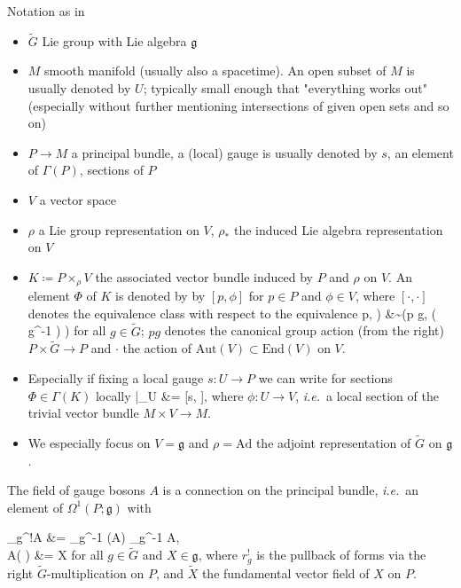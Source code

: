 \documentclass[a4paper,oneside,11pt,bibliography=totoc]{scrartcl}
\def\bas#1\eas{\begin{align*}#1\end{align*}}
\theoremstyle{plain}
\theoremstyle{remark}
\theoremstyle{definition}
\begin{document}
Notation as in \cite{Hamilton}

\begin{itemize}
	\item $\widetilde{G}$ Lie group with Lie algebra $\mathfrak{g}$
	\item $M$ smooth manifold (usually also a spacetime). An open subset of $M$ is usually denoted by $U$; typically small enough that "everything works out" (especially without further mentioning intersections of given open sets and so on)
	\item $P \to M$ a principal bundle, a (local) gauge is usually denoted by $s$, an element of $\Gamma(P)$, sections of $P$
	\item $V$ a vector space
	\item $\rho$ a Lie group representation on $V$, $\rho_*$ the induced Lie algebra representation on $V$
	\item $K \coloneqq P \times_\rho V$ the associated vector bundle induced by $P$ and $\rho$ on $V$. An element $\Phi$ of $K$ is denoted by by $[p, \phi]$ for $p \in P$ and $\phi \in V$, where $[ \cdot, \cdot]$ denotes the equivalence class with respect to the equivalence
	\bas
		(p, \phi) &\sim \mleft(p g, \rho\mleft( g^{-1} \mright) \cdot \phi \mright)
	\eas
	for all $g \in \widetilde{G}$; $pg$ denotes the canonical group action (from the right) $P \times \widetilde{G} \to P$ and $\cdot$ the action of $\mathrm{Aut}(V) \subset \mathrm{End}(V)$ on $V$.
	\item Especially if fixing a local gauge $s: U \to P$ we can write for sections $\Phi \in \Gamma(K)$ locally 
	\bas
		\Phi|_U
		&=
		[s, \phi],
	\eas
	where $\phi: U \to V$, \textit{i.e.}\ a local section of the trivial vector bundle $M \times V \to M$.
	\item We especially focus on $V = \mathfrak{g}$ and $\rho = \mathrm{Ad}$ the adjoint representation of $\widetilde{G}$ on $\mathfrak{g}$.
\end{itemize}

The field of gauge bosons $A$ is a connection on the principal bundle, \textit{i.e.}\ an element of $\Omega^1(P; \mathfrak{g})$ with

\bas
r_g^!A &= _{g^{-1}} (A) \coloneqq {}_{g^{-1}} \circ A, \\
A\mleft(  \mright) &= X
\eas
for all $g \in \widetilde{G}$ and $X \in \mathfrak{g}$, where $r_g^!$ is the pullback of forms via the right $\widetilde{G}$-multiplication on $P$, and $\widetilde{X}$ the fundamental vector field of $X$ on $P$. 
\end{document}
